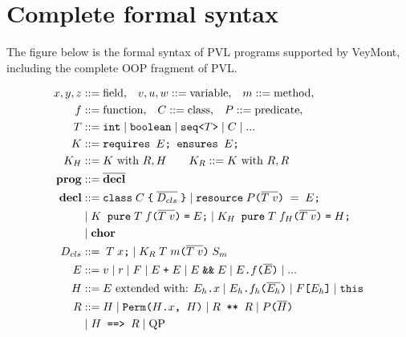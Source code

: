 \section{Complete formal syntax} \label{app:syntax}

The figure below is the formal syntax of PVL programs supported by VeyMont, including the complete OOP fragment of PVL.

\begin{figure}[t]
\begin{adjustwidth}{-0.15\paperwidth}{-0.15\paperwidth}
\begin{minipage}{0.5\textwidth}
\begin{align*}
x, y, z &::= \textrm{field,} \quad v, u, w ::= \textrm{variable,} \quad m ::= \textrm{method,}\\
f &::= \textrm{function,} \quad C ::= \textrm{class,} \quad P ::= \textrm{predicate,} \\
T &::= \texttt{int} \mid \texttt{boolean} \mid \texttt{seq<}T\texttt{>} \mid C \mid ... \\
K &::= \texttt{requires $E$; ensures $E$;} \qquad  \\
K_H &::= \textrm{$K$ with $R, H$} \qquad K_R ::= \textrm{$K$ with $R, R$} \\
\textrm{\textbf{prog}} &::= \overline{\textrm{\textbf{decl}}} \\
\textrm{\textbf{decl}} &::= \texttt{class} \; C \; \texttt{\{} \; \overline{D_{cls}} \; \texttt{\}} 
\mid \texttt{resource} \; P\parens{\overline{T \; v}} \; = \; E\texttt{;} \\
& \mid \texttt{$K$ pure} \; T \; f \parens{\overline{T \; v}} \; \texttt{=} \; E\texttt{;} \mid \texttt{$K_H$ pure} \; T \; f_H \parens{\overline{T \; v}} \; \texttt{=} \; H\texttt{;} \\
& \mid \textrm{\textbf{chor}} \\
D_{cls} &::= \; T \; x\texttt{;} \mid K_R \; T \; m \texttt{(} \overline{T \; v} \texttt{)} \; S_m \\
E &::= v \mid r \mid F \mid E \; \texttt{+} \; E \; | \; E \; \texttt{\&\&} \; E \mid E\texttt{.}f\parens{\overline{E}} \mid ... \\
H &::= \textrm{$E$ extended with: $\texttt{$E_h$.$x$} \mid \texttt{$E_h$.$f_h$($\overline{E_h}$)}$} \mid \texttt{$F$[$E_h$]} \mid \texttt{this} \\
R &::= H \mid \texttt{Perm($H$.$x$, $H$)} \mid \texttt{$R$ ** $R$} \mid \texttt{$P$($\overline{H}$)} \\
& \mid \texttt{$H$ ==> $R$} \mid \textrm{QP} \\

\end{align*}
\end{minipage}
\end{adjustwidth}
\end{figure}
